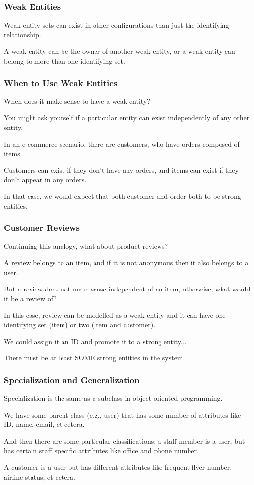 \begin{frame}
\frametitle{Weak Entities}

Weak entity sets can exist in other configurations than just the identifying relationship. 

A weak entity can be the owner of another weak entity, or a weak entity can belong to more than one identifying set.

\end{frame}


\begin{frame}
\frametitle{When to Use Weak Entities}

When does it make sense to have a weak entity? 

You might ask yourself if a particular entity can exist independently of any other entity. 

In an e-commerce scenario, there are customers, who have orders composed of items. 

Customers can exist if they don't have any orders, and items can exist if they don't appear in any orders. 

In that case, we would expect that both customer and order both to be strong entities.

\end{frame}



\begin{frame}
\frametitle{Customer Reviews}

Continuing this analogy, what about product reviews? 

A review belongs to an item, and if it is not anonymous then it also belongs to a user. 

But a review does not make sense independent of an item, otherwise, what would it be a review of? 

In this case, review can be modelled as a weak entity and it can have one identifying set (item) or two (item and customer).

We could assign it an ID and promote it to a strong entity...

There must be at least SOME strong entities in the system.

\end{frame}



\begin{frame}
\frametitle{Specialization and Generalization}

\alert{Specialization} is the same as a subclass in object-oriented-programming.

 We have some parent class (e.g., user) that has some number of attributes like ID, name, email, et cetera. 
 
 And then there are some particular classifications: a staff member is a user, but has certain staff specific attributes like office and phone number. 
 
 A customer is a user but has different attributes like frequent flyer number, airline status, et cetera. 

\end{frame}




